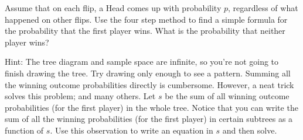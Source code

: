 \documentclass[14pt]{extarticle}
\begin{document}
Assume that on each flip, a Head comes up with probability $p$, regardless of what happened on other flips. Use the four step method to find a simple formula for the probability that the first player wins. What is the probability that neither player wins?

Hint: The tree diagram and sample space are infinite, so you’re not going to finish drawing the tree. Try drawing only enough to see a pattern. Summing all the winning outcome probabilities directly is cumbersome. However, a neat trick solves this problem; and many others. Let $s$ be the sum of all winning outcome probabilities (for the first player) in the whole tree. Notice that you can write the sum of all the winning probabilities (for the first player) in certain subtrees as a function of $s$. Use this observation to write an equation in $s$ and then solve.
\end{document}
